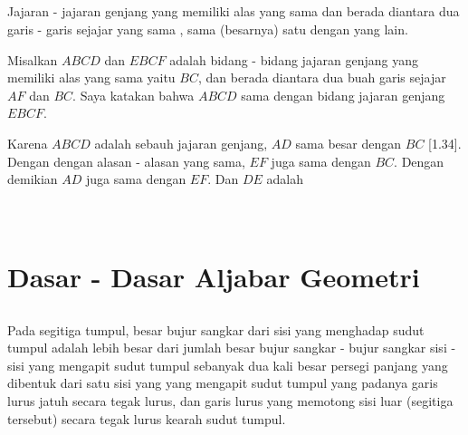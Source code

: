 \documentclass[a4paper, 12pt]{book}
\begin{document}

\section*{\centering \thesection}
\par Jajaran - jajaran genjang yang memiliki alas yang sama dan berada diantara dua
garis - garis sejajar yang sama , sama (besarnya) satu dengan yang lain.  


Misalkan $ABCD$ dan $EBCF$ adalah bidang - bidang jajaran genjang yang memiliki alas yang sama yaitu $BC$, 
dan berada diantara dua buah garis sejajar $AF$ dan $BC$. Saya katakan bahwa $ABCD$ sama dengan bidang
jajaran genjang $EBCF$.  

Karena $ABCD$ adalah sebauh jajaran genjang, $AD$ sama besar dengan $BC$ [1.34]. Dengan dengan alasan - alasan
yang sama, $EF$ juga sama dengan $BC$. Dengan demikian $AD$ juga sama dengan $EF$. Dan $DE$ adalah 

\setcounter{chapter}{2}
\chapter*{\centering \chaptername{ \thechapter} \\Dasar - Dasar Aljabar Geometri}
\setcounter{section}{12}
\section*{\centering \thesection} 

Pada segitiga tumpul, besar bujur sangkar dari sisi yang menghadap sudut tumpul
 adalah lebih besar dari jumlah besar bujur sangkar - bujur sangkar sisi - sisi yang 
mengapit sudut tumpul sebanyak dua kali besar persegi panjang yang dibentuk
dari satu sisi yang yang mengapit sudut tumpul yang padanya garis lurus jatuh
secara tegak lurus, dan garis lurus yang memotong sisi luar (segitiga tersebut) secara tegak lurus 
kearah sudut tumpul.
\end{document}
